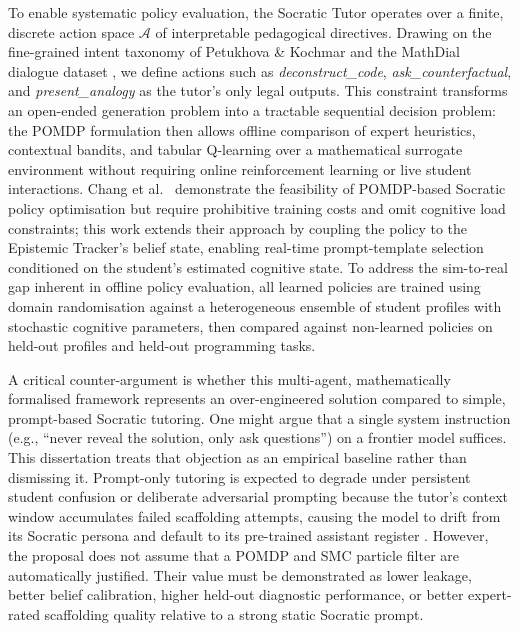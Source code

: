 \documentclass[11pt,a4paper]{report}
\begin{document}
To enable systematic policy evaluation, the Socratic Tutor operates over a finite, discrete action space $\mathcal{A}$ of interpretable pedagogical directives. Drawing on the fine-grained intent taxonomy of Petukhova \& Kochmar \cite{petukhova2025intent} and the MathDial dialogue dataset \cite{macina2023mathdial}, we define actions such as \textit{deconstruct\_code}, \textit{ask\_counterfactual}, and \textit{present\_analogy} as the tutor's only legal outputs. This constraint transforms an open-ended generation problem into a tractable sequential decision problem: the POMDP formulation then allows offline comparison of expert heuristics, contextual bandits, and tabular Q-learning over a mathematical surrogate environment without requiring online reinforcement learning or live student interactions. Chang et al.\ \cite{chang2026pearl} demonstrate the feasibility of POMDP-based Socratic policy optimisation but require prohibitive training costs and omit cognitive load constraints; this work extends their approach by coupling the policy to the Epistemic Tracker's belief state, enabling real-time prompt-template selection conditioned on the student's estimated cognitive state. To address the sim-to-real gap inherent in offline policy evaluation, all learned policies are trained using domain randomisation against a heterogeneous ensemble of student profiles with stochastic cognitive parameters, then compared against non-learned policies on held-out profiles and held-out programming tasks.

A critical counter-argument is whether this multi-agent, mathematically formalised framework represents an over-engineered solution compared to simple, prompt-based Socratic tutoring. One might argue that a single system instruction (e.g., ``never reveal the solution, only ask questions'') on a frontier model suffices. This dissertation treats that objection as an empirical baseline rather than dismissing it. Prompt-only tutoring is expected to degrade under persistent student confusion or deliberate adversarial prompting because the tutor's context window accumulates failed scaffolding attempts, causing the model to drift from its Socratic persona and default to its pre-trained assistant register \cite{liu2024socraticlm}. However, the proposal does not assume that a POMDP and SMC particle filter are automatically justified. Their value must be demonstrated as lower leakage, better belief calibration, higher held-out diagnostic performance, or better expert-rated scaffolding quality relative to a strong static Socratic prompt.
\end{document}
